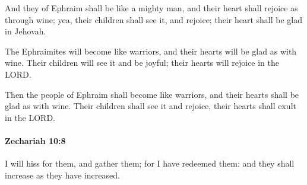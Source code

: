 			\begin{versebox}
					\item[BHS] 
					\item[LXX] 
					\item[ASV] And they of Ephraim shall be like a mighty man, and their heart shall rejoice as through wine; yea, their children shall see it, and rejoice; their heart shall be glad in Jehovah.
					\item[NIV] The Ephraimites will become like warriors, and their hearts will be glad as with wine. Their children will see it and be joyful; their hearts will rejoice in the LORD.
					\item[NRSV] Then the people of Ephraim shall become like warriors, and their hearts shall be glad as with wine. Their children shall see it and rejoice, their hearts shall exult in the LORD.
			\end{versebox}

		\paragraph{Zechariah 10:8} %
			\label{ZECHARIAH-10-8}

			I will hiss for them, and gather them; for I have redeemed them: and they shall increase as they have increased.


